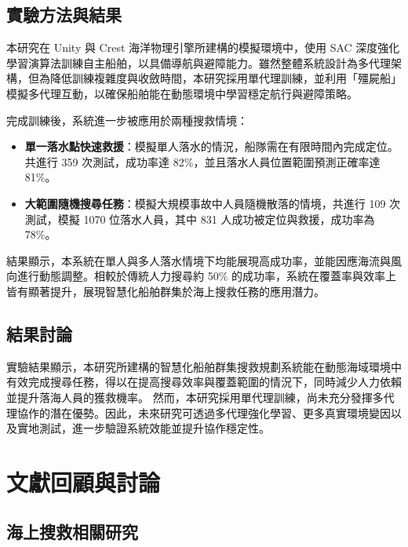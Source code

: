 \documentclass[12pt,a4paper]{article}
\begin{document}
\subsection{實驗方法與結果}
本研究在 Unity 與 Crest 海洋物理引擎所建構的模擬環境中，使用 SAC 深度強化學習演算法訓練自主船舶，以具備導航與避障能力。雖然整體系統設計為多代理架構，但為降低訓練複雜度與收斂時間，本研究採用單代理訓練，並利用「殭屍船」模擬多代理互動，以確保船舶能在動態環境中學習穩定航行與避障策略。

完成訓練後，系統進一步被應用於兩種搜救情境：  
\begin{itemize}
    \item \textbf{單一落水點快速救援}：模擬單人落水的情況，船隊需在有限時間內完成定位。共進行 359 次測試，成功率達 82\%，並且落水人員位置範圍預測正確率達 81\%。  
    \item \textbf{大範圍隨機搜尋任務}：模擬大規模事故中人員隨機散落的情境，共進行 109 次測試，模擬 1070 位落水人員，其中 831 人成功被定位與救援，成功率為 78\%。  
\end{itemize}

結果顯示，本系統在單人與多人落水情境下均能展現高成功率，並能因應海流與風向進行動態調整。相較於傳統人力搜尋約 50\% 的成功率，系統在覆蓋率與效率上皆有顯著提升，展現智慧化船舶群集於海上搜救任務的應用潛力。


\subsection{結果討論}
實驗結果顯示，本研究所建構的智慧化船舶群集搜救規劃系統能在動態海域環境中有效完成搜尋任務，得以在提高搜尋效率與覆蓋範圍的情況下，同時減少人力依賴並提升落海人員的獲救機率。  然而，本研究採用單代理訓練，尚未充分發揮多代理協作的潛在優勢。因此，未來研究可透過多代理強化學習、更多真實環境變因以及實地測試，進一步驗證系統效能並提升協作穩定性。



\newpage

\section{文獻回顧與討論}

\subsection{海上搜救相關研究}
\end{document}
